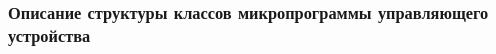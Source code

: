 \subsubsection{Описание структуры классов микропрограммы управляющего устройства}
% 
% 
% 
% 
% 
% 
% 
